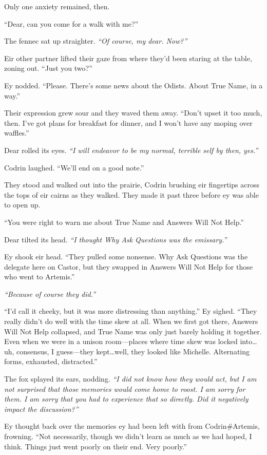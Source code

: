 Only one anxiety remained, then.

``Dear, can you come for a walk with me?''

The fennec sat up straighter. \emph{``Of course, my dear. Now?''}

Eir other partner lifted their gaze from where they'd been staring at the table, zoning out. ``Just you two?''

Ey nodded. ``Please. There's some news about the Odists. About True Name, in a way.''

Their expression grew sour and they waved them away. ``Don't upset it too much, then. I've got plans for breakfast for dinner, and I won't have any moping over waffles.''

Dear rolled its eyes. \emph{``I will endeavor to be my normal, terrible self by then, yes.''}

Codrin laughed. ``We'll end on a good note.''

They stood and walked out into the prairie, Codrin brushing eir fingertips across the tops of eir cairns as they walked. They made it past three before ey was able to open up.

``You were right to warn me about True Name and Answers Will Not Help.''

Dear tilted its head. \emph{``I thought Why Ask Questions was the emissary.''}

Ey shook eir head. ``They pulled some nonsense. Why Ask Questions was the delegate here on Castor, but they swapped in Answers Will Not Help for those who went to Artemis.''

\emph{``Because of course they did.''}

``I'd call it cheeky, but it was more distressing than anything.'' Ey sighed. ``They really didn't do well with the time skew at all. When we first got there, Answers Will Not Help collapsed, and True Name was only just barely holding it together. Even when we were in a unison room—places where time skew was locked into\ldots uh, consensus, I guess—they kept\ldots well, they looked like Michelle. Alternating forms, exhausted, distracted.''

The fox splayed its ears, nodding. \emph{``I did not know how they would act, but I am not surprised that those memories would come home to roost. I am sorry for them. I am sorry that you had to experience that so directly. Did it negatively impact the discussion?''}

Ey thought back over the memories ey had been left with from Codrin\#Artemis, frowning. ``Not necessarily, though we didn't learn as much as we had hoped, I think. Things just went poorly on their end. Very poorly.''

